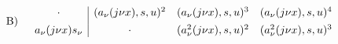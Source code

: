 
\[
\begin{array}{r@{\quad}c}
\text{B)}&
\begin{array}{c|ccc}
\cdot&(a_\nu(j\nu x),s,u)^2&(a_\nu(j\nu x),s,u)^3&(a_\nu(j\nu x),s,u)^4\\[0.45em]
a_\nu(j\nu x)s_\nu&\cdot&(a_\nu^2(j\nu x),s,u)^2&(a_\nu^2(j\nu x),s,u)^3
\end{array}
\end{array}
\]
